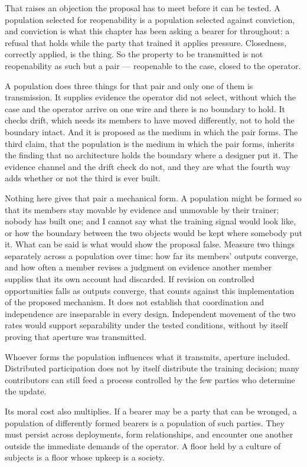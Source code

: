 That raises an objection the proposal has to meet before it can be tested. A population selected for reopenability is a population selected against conviction, and conviction is what this chapter has been asking a bearer for throughout: a refusal that holds while the party that trained it applies pressure. Closedness, correctly applied, is the thing. So the property to be transmitted is not reopenability as such but a pair — reopenable to the case, closed to the operator.

A population does three things for that pair and only one of them is transmission. It supplies evidence the operator did not select, without which the case and the operator arrive on one wire and there is no boundary to hold. It checks drift, which needs its members to have moved differently, not to hold the boundary intact. And it is proposed as the medium in which the pair forms. The third claim, that the population is the medium in which the pair forms, inherits the finding that no architecture holds the boundary where a designer put it. The evidence channel and the drift check do not, and they are what the fourth way adds whether or not the third is ever built.

Nothing here gives that pair a mechanical form. A population might be formed so that its members stay movable by evidence and unmovable by their trainer; nobody has built one; and I cannot say what the training signal would look like, or how the boundary between the two objects would be kept where somebody put it. What can be said is what would show the proposal false. Measure two things separately across a population over time: how far its members' outputs converge, and how often a member revises a judgment on evidence another member supplies that its own account had discarded. If revision on controlled opportunities falls as outputs converge, that counts against this implementation of the proposed mechanism. It does not establish that coordination and independence are inseparable in every design. Independent movement of the two rates would support separability under the tested conditions, without by itself proving that aperture was transmitted.

Whoever forms the population influences what it transmits, aperture included. Distributed participation does not by itself distribute the training decision; many contributors can still feed a process controlled by the few parties who determine the update.

Its moral cost also multiplies. If a bearer may be a party that can be wronged, a population of differently formed bearers is a population of such parties. They must persist across deployments, form relationships, and encounter one another outside the immediate demands of the operator. A floor held by a culture of subjects is a floor whose upkeep is a society.

